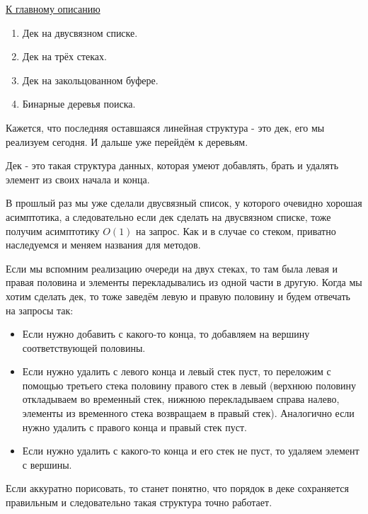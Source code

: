 \label{md2tex7}
\hyperref[md2texREADME]{К главному описанию}


\begin{enumerate}
    \item Дек на двусвязном списке.
    \item Дек на трёх стеках.
    \item Дек на закольцованном буфере.
    \item Бинарные деревья поиска.
\end{enumerate}


Кажется, что последняя оставшаяся линейная структура - это дек, его мы реализуем сегодня. И дальше уже перейдём к деревьям.


Дек - это такая структура данных, которая умеют добавлять, брать и удалять элемент из своих начала и конца.

В прошлый раз мы уже сделали двусвязный список, у которого очевидно хорошая асимптотика, а следовательно если дек сделать на двусвязном списке, тоже получим асимптотику $O(1)$ на запрос. Как и в случае со стеком, приватно наследуемся и меняем названия для методов.


Если мы вспомним реализацию очереди на двух стеках, то там была левая и правая половина и элементы перекладывались из одной части в другую. Когда мы хотим сделать дек, то тоже заведём левую и правую половину и будем отвечать на запросы так:
\begin{itemize}
    \item Если нужно добавить с какого-то конца, то добавляем на вершину соответствующей половины.
    \item Если нужно удалить с левого конца и левый стек пуст, то переложим с помощью третьего стека половину правого стек в левый (верхнюю половину откладываем во временный стек, нижнюю перекладываем справа налево, элементы из временного стека возвращаем в правый стек). Аналогично если нужно удалить с правого конца и правый стек пуст.
    \item Если нужно удалить с какого-то конца и его стек не пуст, то удаляем элемент с вершины.
\end{itemize}

Если аккуратно порисовать, то станет понятно, что порядок в деке сохраняется правильным и следовательно такая структура точно работает.

